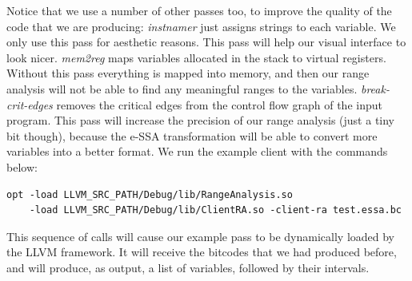 \documentclass{paper}
\begin{document}
Notice that we use a number of other passes too, to improve the quality of the
code that we are producing:
\textit{instnamer} just assigns strings to each variable.
We only use this pass for aesthetic reasons.
This pass will help our visual interface to look nicer.
\textit{mem2reg} maps variables allocated in the stack to virtual registers.
Without this pass everything is mapped into memory, and then our range analysis
will not be able to find any meaningful ranges to the variables.
\textit{break-crit-edges} removes the critical edges from the control flow graph
of the input program.
This pass will increase the precision of our range analysis (just a tiny bit
though), because the e-SSA transformation will be able to convert more variables
into a better format.
We run the example client with the commands below:
\begin{lstlisting}[frame=single]
opt -load LLVM_SRC_PATH/Debug/lib/RangeAnalysis.so 
    -load LLVM_SRC_PATH/Debug/lib/ClientRA.so -client-ra test.essa.bc
\end{lstlisting}
This sequence of calls will cause our example pass to be dynamically loaded
by the LLVM framework.
It will receive the bitcodes that we had produced before, and will produce,
as output, a list of variables, followed by their intervals.





\end{document}
